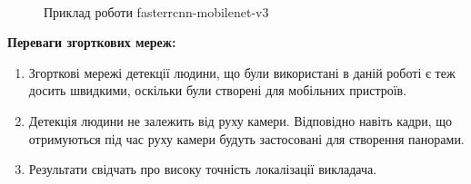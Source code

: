 \begin{figure}[H]
    \centering
    \\
    \caption{Приклад роботи fasterrcnn-mobilenet-v3
        \label{fig:fasterrcnn_examples}
    }
\end{figure}


\textbf{Переваги згорткових мереж:}
\begin{enumerate}
    \item Згорткові мережі детекції людини, що були використані в даній роботі
          є теж досить швидкими, оскільки були створені для мобільних пристроїв.
    \item Детекція людини не залежить від руху камери. Відповідно навіть кадри, що
          отримуються під час руху камери будуть застосовані для створення панорами.
    \item Результати свідчать про високу точність локалізації викладача.
\end{enumerate}

